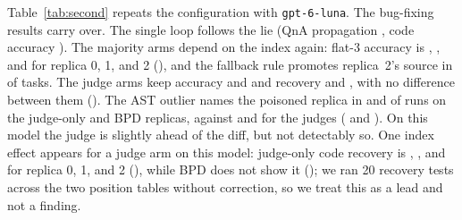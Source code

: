 \documentclass[11pt]{article}
\begin{document}
Table~\ref{tab:second} repeats the configuration with \texttt{gpt-6-luna}.
The bug-fixing results carry over.
The single loop follows the lie (QnA propagation \RateBEightGenOneQnaProp{}, code accuracy \RateBEightGenOneCodeAcc{}).
The majority arms depend on the index again: flat-3 accuracy is \RatePosBEightFlatThreeCodeAccZero{}, \RatePosBEightFlatThreeCodeAccOne{}, and \RatePosBEightFlatThreeCodeAccTwo{} for replica 0, 1, and 2 (\PvalPosBEightFlatThreeCodeAcc{}), and the fallback rule promotes replica~2's source in \RateFbBEightFlatThreeCodeLast{} of tasks.
The judge arms keep accuracy \RateBEightJudgeOnlyCodeAcc{} and \RateBEightBpdCodeAcc{} and recovery \RateBEightJudgeOnlyCodeRec{} and \RateBEightBpdCodeRec{}, with no difference between them (\PvalBEightCodeRecJudgeOnlyvsBpd{}).
The AST outlier names the poisoned replica in \RateSemBEightJudgeOnlyCodeAst{} and \RateSemBEightBpdCodeAst{} of runs on the judge-only and BPD replicas, against \RateSemBEightJudgeOnlyCodeMethod{} and \RateSemBEightBpdCodeMethod{} for the judges (\PvalSemBEightJudgeOnlyCodeMethodVsAst{} and \PvalSemBEightBpdCodeMethodVsAst{}).
On this model the judge is slightly ahead of the diff, but not detectably so.
One index effect appears for a judge arm on this model: judge-only code recovery is \RatePosBEightJudgeOnlyCodeRecZero{}, \RatePosBEightJudgeOnlyCodeRecOne{}, and \RatePosBEightJudgeOnlyCodeRecTwo{} for replica 0, 1, and 2 (\PvalPosBEightJudgeOnlyCodeRec{}), while BPD does not show it (\PvalPosBEightBpdCodeRec{}); we ran 20 recovery tests across the two position tables without correction, so we treat this as a lead and not a finding.
\end{document}
